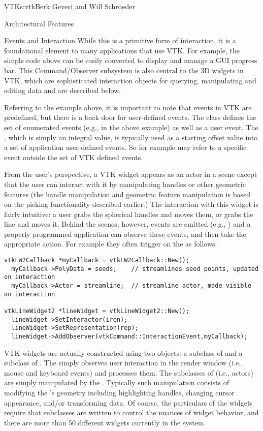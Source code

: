 \begin{aosachapter}{VTK}{s:vtk}{Berk Geveci and Will Schroeder}
\begin{aosasect1}{Architectural Features}
\begin{aosasect2}{Events and Interaction}
While this is a primitive form of interaction, it is a foundational
element to many applications that use VTK\@. For example, the simple
code above can be easily converted to display and manage a GUI
progress bar. This Command/Observer subsystem is also central to the
3D widgets in VTK, which are sophisticated interaction objects for
querying, manipulating and editing data and are described below.

Referring to the example above, it is important to note that events in
VTK are predefined, but there is a back door for user-defined
events. The class  defines the set of enumerated
events (e.g.,  in the above example)
as well as a user event. The , which is simply an integral
value, is typically used as a starting offset value into a set of
application user-defined events. So for example
 may refer to a specific event outside
the set of VTK defined events.

From the user's perspective, a VTK widget appears as an actor in a
scene except that the user can interact with it by manipulating
handles or other geometric features (the handle manipulation and
geometric feature manipulation is based on the picking functionality
described earlier.) The interaction with this widget is fairly
intuitive: a user grabs the spherical handles and moves them, or grabs
the line and moves it. Behind the scenes, however, events are emitted
(e.g., ) and a properly programmed application
can observe these events, and then take the appropriate action. For
example they often trigger on the 
as follows:

\begin{verbatim}
vtkLW2Callback *myCallback = vtkLW2Callback::New();
  myCallback->PolyData = seeds;    // streamlines seed points, updated on interaction
  myCallback->Actor = streamline;  // streamline actor, made visible on interaction

vtkLineWidget2 *lineWidget = vtkLineWidget2::New();
  lineWidget->SetInteractor(iren);
  lineWidget->SetRepresentation(rep);
  lineWidget->AddObserver(vtkCommand::InteractionEvent,myCallback);
\end{verbatim}

VTK widgets are actually constructed using two objects: a subclass of
 and a subclass of . The
 simply observes user interaction in the
render window (i.e., mouse and keyboard events) and processes
them. The subclasses of  (i.e., actors) are simply
manipulated by the . Typically such
manipulation consists of modifying the 's geometry
including highlighting handles, changing cursor appearance, and/or
transforming data. Of course, the particulars of the widgets require
that subclasses are written to control the nuances of widget behavior,
and there are more than 50 different widgets currently in the system.


\end{aosasect2}
\end{aosasect1}
\end{aosachapter}

